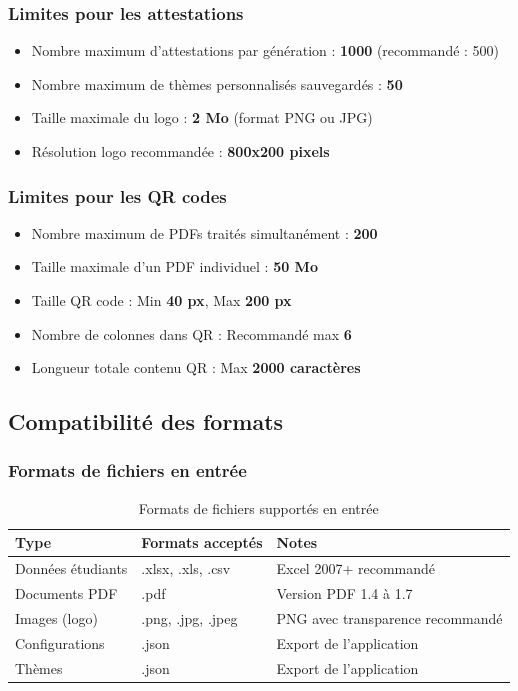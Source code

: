 \subsubsection{Limites pour les attestations}

\begin{itemize}[leftmargin=*]
    \item Nombre maximum d'attestations par génération : \textbf{1000} (recommandé : 500)
    \item Nombre maximum de thèmes personnalisés sauvegardés : \textbf{50}
    \item Taille maximale du logo : \textbf{2 Mo} (format PNG ou JPG)
    \item Résolution logo recommandée : \textbf{800x200 pixels}
\end{itemize}

\subsubsection{Limites pour les QR codes}

\begin{itemize}[leftmargin=*]
    \item Nombre maximum de PDFs traités simultanément : \textbf{200}
    \item Taille maximale d'un PDF individuel : \textbf{50 Mo}
    \item Taille QR code : Min \textbf{40 px}, Max \textbf{200 px}
    \item Nombre de colonnes dans QR : Recommandé max \textbf{6}
    \item Longueur totale contenu QR : Max \textbf{2000 caractères}
\end{itemize}

\subsection{Compatibilité des formats}

\subsubsection{Formats de fichiers en entrée}

\begin{table}[h]
\centering
\begin{tabular}{|l|p{5cm}|p{5cm}|}
\hline
\textbf{Type} & \textbf{Formats acceptés} & \textbf{Notes} \\
\hline
Données étudiants & .xlsx, .xls, .csv & Excel 2007+ recommandé \\
\hline
Documents PDF & .pdf & Version PDF 1.4 à 1.7 \\
\hline
Images (logo) & .png, .jpg, .jpeg & PNG avec transparence recommandé \\
\hline
Configurations & .json & Export de l'application \\
\hline
Thèmes & .json & Export de l'application \\
\hline
\end{tabular}
\caption{Formats de fichiers supportés en entrée}
\end{table}

